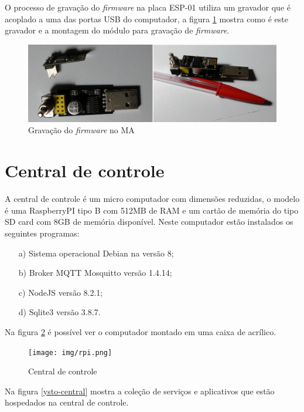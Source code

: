 O processo de gravação do \textit{firmware} na placa ESP-01 utiliza um gravador que é acoplado a uma das portas USB do computador, a figura \ref{gravacao-firmware} mostra como é este gravador e a montagem do módulo para gravação de \textit{firmware}.

\begin{figure}[H]
\caption{\label{gravacao-firmware} Gravação do \textit{firmware} no MA}
\includegraphics[scale=0.11]{img/gravador-firmware.png}
\end{figure}

\section{Central de controle}
A central de controle é um micro computador com dimensões reduzidas, o modelo é uma RaspberryPI tipo B com 512MB de RAM e um cartão de memória do tipo SD card com 8GB de memória disponível. Neste computador estão instalados os seguintes programas:

\begin{itemize}
    \item[a)] Sistema operacional Debian na versão 8;
    \item[b)] Broker MQTT Mosquitto versão 1.4.14;
    \item[c)] NodeJS versão 8.2.1;
    \item[d)] Sqlite3 versão 3.8.7.
\end{itemize}

Na figura \ref{raspberry-case} é possível ver o computador montado em uma caixa de acrílico.

\begin{figure}[H]
\caption{\label{raspberry-case} Central de controle}
\texttt{[image: img/rpi.png]}
\end{figure}

Na figura \ref{ysto-central} mostra a coleção de serviços e aplicativos que estão hospedados na central de controle.

